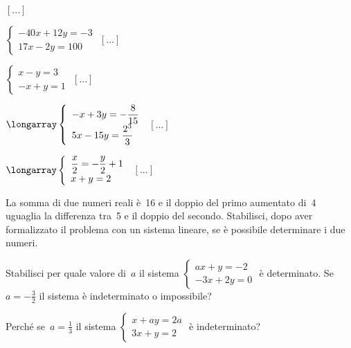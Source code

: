 \begin{esercizio}
\begin{multicols}{2}
\begin{enumeratea}
 \hfill $\left[...\right]$
\item $\left\{\begin{array}{l}-40x+12y=-3\\17x-2y=100\end{array}\right.$
 \hfill $\left[...\right]$
\item $\left\{\begin{array}{l}x-y=3 \\-x+y=1 \end{array}\right.$
 \hfill $\left[...\right]$
\item $\longarray\left\{\begin{array}{l}
-x+3y=-{\dfrac{8}{15}}\\
5x-15y=\dfrac{2^{3}}{3}\end{array}\right.$
 \hfill $\left[...\right]$
\item $\longarray\left\{\begin{array}{l}
\dfrac{x}{2}=-{\dfrac{y}{2}}+1\\
x+y=2\end{array}\right.$
 \hfill $\left[...\right]$
\end{enumeratea}
\end{multicols}
\end{esercizio}

\begin{esercizio}
 \label{ese:22.34}
La somma di due numeri reali è~16 e il doppio del
primo aumentato di~4 uguaglia la differenza tra~5 e il doppio del
secondo. Stabilisci, dopo aver formalizzato il problema con un sistema
lineare, se è possibile determinare i due numeri.
\end{esercizio}

\begin{esercizio}
 \label{ese:22.35}
Stabilisci per quale valore di~$a$ il sistema
$\left\{\begin{array}{l}ax+y=-2\\-3x+2y=0\end{array}\right.$ è
determinato. Se~$a=-{\frac{3}{2}}$ il sistema è indeterminato o
impossibile?
\end{esercizio}

\begin{esercizio}
 \label{ese:22.36}
Perché se~$a=\frac{1}{3}$ il sistema
$\left\{\begin{array}{l}x+ay=2a\\3x+y=2\end{array}\right.$ è
indeterminato?
\end{esercizio}

